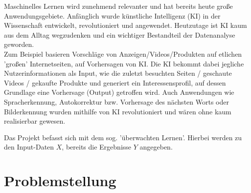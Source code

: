 Maschinelles Lernen wird zunehmend relevanter und hat bereits heute große Anwendungsgebiete.
Anfänglich wurde künstliche Intelligenz (KI) in der Wissenschaft entwickelt, revolutioniert und angewendet.
Heutzutage ist KI kaum aus dem Alltag wegzudenken und ein wichtiger Bestandteil der Datenanalyse geworden.
\\
Zum Beispiel basieren Vorschläge von Anzeigen/Videos/Produkten auf etlichen 'großen' Internetseiten, auf Vorhersagen von KI.
Die KI bekommt dabei jegliche Nutzerinformationen als Input, wie die zuletzt besuchten Seiten / geschaute Videos / gekaufte Produkte und generiert ein Interessensprofil, auf dessen Grundlage eine Vorhersage (Output) getroffen wird.
Auch Anwendungen wie Spracherkennung, Autokorrektur bzw. Vorhersage des nächsten Worts oder Bilderkennung wurden mithilfe von KI revolutioniert und wären ohne kaum realisierbar gewesen.

%
Das Projekt befasst sich mit dem sog. 'überwachten Lernen'.
Hierbei werden zu den Input-Daten $X$, bereits die Ergebnisse $Y$ angegeben.

\section{Problemstellung}
